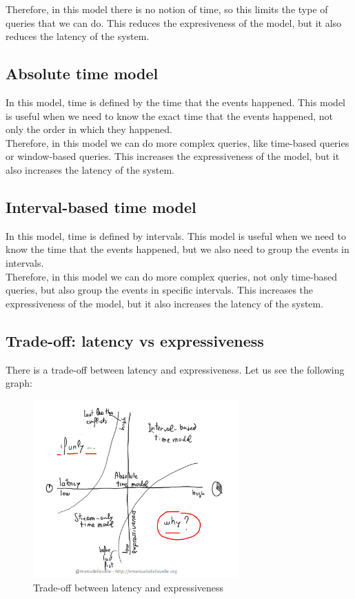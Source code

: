 Therefore, in this model there is no notion of time, so this limits the type of queries
that we can do. This reduces the expresiveness of the model, but it also reduces the
latency of the system.

\subsection{Absolute time model}

In this model, time is defined by the time that the events happened. This model is 
useful when we need to know the exact time that the events happened, not only the order
in which they happened.\\

Therefore, in this model we can do more complex queries, like time-based queries or
window-based queries. This increases the expressiveness of the model, but it also
increases the latency of the system.

\subsection{Interval-based time model}

In this model, time is defined by intervals. This model is useful when we need to know
the time that the events happened, but we also need to group the events in intervals.\\

Therefore, in this model we can do more complex queries, not only time-based queries,
but also group the events in specific intervals. This increases the expressiveness of
the model, but it also increases the latency of the system.

\subsection{Trade-off: latency vs expressiveness}

There is a trade-off between latency and expressiveness. Let us see the following 
graph:

\begin{figure}[H]
    \centering
    \includegraphics[width=0.7\textwidth]{figures/image_express_vs_lat.png}
    \caption{Trade-off between latency and expressiveness}
    \label{fig:trade-off-lat-expr}
\end{figure}

